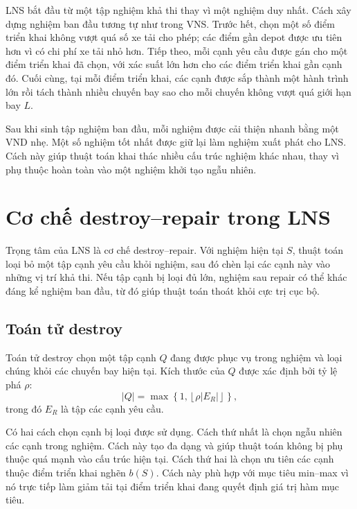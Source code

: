 LNS bắt đầu từ một tập nghiệm khả thi thay vì một nghiệm duy nhất. Cách xây dựng nghiệm ban đầu tương tự như trong VNS. Trước hết, chọn một số điểm triển khai không vượt quá số xe tải cho phép; các điểm gần depot được ưu tiên hơn vì có chi phí xe tải nhỏ hơn. Tiếp theo, mỗi cạnh yêu cầu được gán cho một điểm triển khai đã chọn, với xác suất lớn hơn cho các điểm triển khai gần cạnh đó. Cuối cùng, tại mỗi điểm triển khai, các cạnh được sắp thành một hành trình lớn rồi tách thành nhiều chuyến bay sao cho mỗi chuyến không vượt quá giới hạn bay $L$.

Sau khi sinh tập nghiệm ban đầu, mỗi nghiệm được cải thiện nhanh bằng một VND nhẹ. Một số nghiệm tốt nhất được giữ lại làm nghiệm xuất phát cho LNS. Cách này giúp thuật toán khai thác nhiều cấu trúc nghiệm khác nhau, thay vì phụ thuộc hoàn toàn vào một nghiệm khởi tạo ngẫu nhiên.

\section{Cơ chế destroy--repair trong LNS}
\label{sec:lns-destroy-repair}

Trọng tâm của LNS là cơ chế destroy--repair. Với nghiệm hiện tại $S$, thuật toán loại bỏ một tập cạnh yêu cầu khỏi nghiệm, sau đó chèn lại các cạnh này vào những vị trí khả thi. Nếu tập cạnh bị loại đủ lớn, nghiệm sau repair có thể khác đáng kể nghiệm ban đầu, từ đó giúp thuật toán thoát khỏi cực trị cục bộ.

\subsection{Toán tử destroy}
\label{subsec:lns-destroy}

Toán tử destroy chọn một tập cạnh $Q$ đang được phục vụ trong nghiệm và loại chúng khỏi các chuyến bay hiện tại. Kích thước của $Q$ được xác định bởi tỷ lệ phá $\rho$:
\begin{equation}
|Q| =
\max\left\{1,\left\lfloor \rho |E_R| \right\rfloor\right\},
\label{eq:lns-destroy-size}
\end{equation}
trong đó $E_R$ là tập các cạnh yêu cầu.

Có hai cách chọn cạnh bị loại được sử dụng. Cách thứ nhất là chọn ngẫu nhiên các cạnh trong nghiệm. Cách này tạo đa dạng và giúp thuật toán không bị phụ thuộc quá mạnh vào cấu trúc hiện tại. Cách thứ hai là chọn ưu tiên các cạnh thuộc điểm triển khai nghẽn $b(S)$. Cách này phù hợp với mục tiêu min--max vì nó trực tiếp làm giảm tải tại điểm triển khai đang quyết định giá trị hàm mục tiêu.

